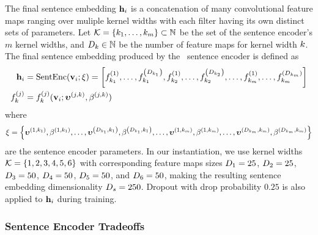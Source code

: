 The final sentence embedding $\mathbf{h}_i$ is 
a concatenation of many convolutional feature maps ranging over muliple kernel widths with each filter having its own distinct sets of parameters.
Let $\mathcal{K} = \{k_1, \ldots, k_m \} \subset \mathbb{N}$ be the set of the sentence encoder's
$m$ kernel widths, and $D_k \in \mathbb{N}$ be the number of feature
maps for kernel width $k$. The final sentence embedding produced
by the \convolutionalneuralnetwork~sentence encoder is defined as 
\begin{align}
\mathbf{h}_i & = \operatorname{SentEnc}(\mathbf{v}_i; \xi) = \left[  
    f^{\left(1\right)}_{k_1},
    \ldots, 
    f^{\left(D_{k_1}\right)}_{k_1}, 
    f^{\left(1\right)}_{k_2},
    \ldots, 
    f^{\left(D_{k_2}\right)}_{k_2}, 
    \ldots, 
    f^{\left(1\right)}_{k_m},
    \ldots, 
    f^{\left(D_{k_m}\right)}_{k_m}
  \right]  \\
    f^{(j)}_{k} &=
f^{(j)}_{k}(\mathbf{v}_i;\boldsymbol{\upsilon}^{(j,k)},\beta^{(j,k)})
\end{align}
where \[ \xi = \left\{ 
    \boldsymbol{\upsilon}^{\left(1,k_1\right)}, \beta^{\left(1,k_1\right)}, \ldots,
    \boldsymbol{\upsilon}^{\left(D_{k_1},k_1\right)}, 
            \beta^{\left(D_{k_1},k_1\right)}, \ldots,
    \boldsymbol{\upsilon}^{\left(1,k_m\right)}, \beta^{\left(1,k_m\right)}, \ldots,
    \boldsymbol{\upsilon}^{\left(D_{k_m},k_m\right)}, 
            \beta^{\left(D_{k_m},k_m\right)}
    \right\}\] are the sentence encoder parameters. 
In our instantiation, we use kernel widths $\mathcal{K} = \{1, 2, 3, 4, 5, 6\}$ with corresponding feature maps sizes 
$D_1=25$, $D_2=25$, $D_3=50$, $D_4=50$, $D_5=50$, and $D_6=50$, making 
the resulting sentence embedding dimensionality $D_{s}=250$. 
Dropout with drop probability $0.25$ is also applied to $\mathbf{h}_i$ during 
training.


\subsubsection{Sentence Encoder Tradeoffs}


